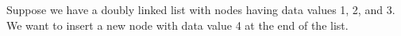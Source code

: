 \documentclass[preview]{standalone}
\begin{document}
Suppose we have a doubly linked list with nodes having data values 1, 2, and 3. We want to insert a new node with data value 4 at the end of the list.\\
\end{document}
